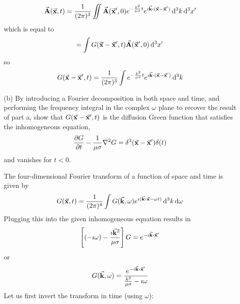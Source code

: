 \documentclass[a4paper,twoside]{article}
\begin{document}
\begin{itemize}
\begin{problem}
            \begin{equation}
                \va{A}( \va{x}, t) = \frac{1}{(2 \pi)^3} \iint \va{A}( \va{x}', 0) e^{- \frac{k^2}{\mu \sigma} t} e^{\imath \va{k} \vdot ( \va{x} - \va{x}')} \dd[3]{k} \dd[3]{x'}
            \end{equation}
            which is equal to
            \begin{equation}
                = \int G( \va{x} - \va{x}', t) \va{A}( \va{x}', 0) \dd[3]{x'}
            \end{equation}
            so
            \begin{equation}
                G( \va{x} - \va{x}', t) = \frac{1}{(2 \pi)^3} \int e^{- \frac{k^2}{\mu \sigma} t} e^{\imath \va{k} \vdot ( \va{x} - \va{x}')} \dd[3]{k}
            \end{equation}
        \end{problem}
    \item[(b)] By introducing a Fourier decomposition in both space and time, and performing the frequency integral in the complex $ \omega $ plane to recover the result of part a, show that $ G( \va{x} - \va{x}', t) $ is the diffusion Green function that satisfies the inhomogeneous equation,
        \begin{equation}
            \pdv{G}{t} - \frac{1}{\mu \sigma} \laplacian{G} = \delta^3( \va{x} - \va{x}') \delta(t)
        \end{equation}
        and vanishes for $ t<0 $.
        \begin{problem}
            The four-dimensional Fourier transform of a function of space and time is given by
            \begin{equation}
                G( \va{x},t) = \frac{1}{(2 \pi)^4} \int G( \va{k}, \omega) e^{\imath (\va{k} \vdot \va{x} - \omega t)} \dd[3]{k} \dd{\omega}
            \end{equation}
            Plugging this into the given inhomogeneous equation results in
            \begin{equation}
                \left[ (- \imath \omega) - \frac{\imath \va{k}^2}{\mu \sigma} \right]G = e^{- \imath \va{k} \vdot \va{x}'}
            \end{equation}
            or
            \begin{equation}
                G( \va{k}, \omega) = \frac{e^{- \imath \va{k} \vdot \va{x}'}}{\frac{k^2}{\mu \sigma} - \imath \omega}
            \end{equation}
            Let us first invert the transform in time (using $ \omega $):

\end{problem}
\end{itemize}
\end{document}
